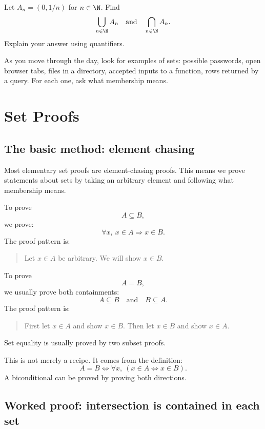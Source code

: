 \begin{exercise}
Let $A_n=(0,1/n)$ for $n\in\N$. Find
\[
\bigcup_{n\in\N}A_n
\quad\text{and}\quad
\bigcap_{n\in\N}A_n.
\]
Explain your answer using quantifiers.
\end{exercise}

\begin{walkbox}
As you move through the day, look for examples of sets: possible passwords, open browser tabs, files in a directory, accepted inputs to a function, rows returned by a query. For each one, ask what membership means.
\end{walkbox}

\section{Set Proofs}

\subsection{The basic method: element chasing}

Most elementary set proofs are element-chasing proofs. This means we prove statements about sets by taking an arbitrary element and following what membership means.

To prove
\[
A\subseteq B,
\]
we prove:
\[
\forall x,\ x\in A\Rightarrow x\in B.
\]
The proof pattern is:

\begin{quote}
Let $x\in A$ be arbitrary. We will show $x\in B$.
\end{quote}

To prove
\[
A=B,
\]
we usually prove both containments:
\[
A\subseteq B\quad\text{and}\quad B\subseteq A.
\]
The proof pattern is:

\begin{quote}
First let $x\in A$ and show $x\in B$. Then let $x\in B$ and show $x\in A$.
\end{quote}

\begin{focusbox}
Set equality is usually proved by two subset proofs.
\end{focusbox}

This is not merely a recipe. It comes from the definition:
\[
A=B\Longleftrightarrow\forall x,\ (x\in A\Longleftrightarrow x\in B).
\]
A biconditional can be proved by proving both directions.

\subsection{Worked proof: intersection is contained in each set}


